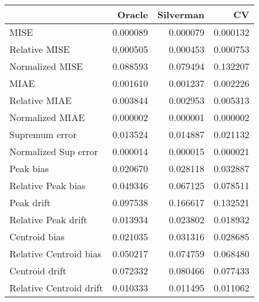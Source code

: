 \begin{tabular}{lrrr}
  \toprule
 & Oracle & Silverman & CV \\ 
  \midrule
MISE & 0.000089 & 0.000079 & 0.000132 \\ 
  Relative MISE & 0.000505 & 0.000453 & 0.000753 \\ 
  Normalized MISE & 0.088593 & 0.079494 & 0.132207 \\ 
  MIAE & 0.001610 & 0.001237 & 0.002226 \\ 
  Relative MIAE & 0.003844 & 0.002953 & 0.005313 \\ 
  Normalized MIAE & 0.000002 & 0.000001 & 0.000002 \\ 
  Supremum error & 0.013524 & 0.014887 & 0.021132 \\ 
  Normalized Sup error & 0.000014 & 0.000015 & 0.000021 \\ 
  Peak bias & 0.020670 & 0.028118 & 0.032887 \\ 
  Relative Peak bias & 0.049346 & 0.067125 & 0.078511 \\ 
  Peak drift & 0.097538 & 0.166617 & 0.132521 \\ 
  Relative Peak drift & 0.013934 & 0.023802 & 0.018932 \\ 
  Centroid bias & 0.021035 & 0.031316 & 0.028685 \\ 
  Relative Centroid bias & 0.050217 & 0.074759 & 0.068480 \\ 
  Centroid drift & 0.072332 & 0.080466 & 0.077433 \\ 
  Relative Centroid drift & 0.010333 & 0.011495 & 0.011062 \\ 
   \bottomrule
\end{tabular}
